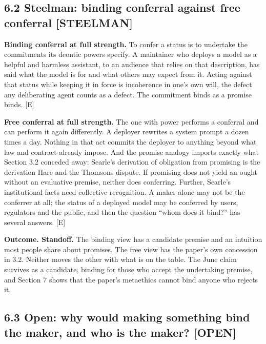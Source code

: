 \documentclass[11pt]{article}
\newcommand{\register}[1]{{\ttfamily\small #1}}
\begin{document}
\subsection*{6.2 Steelman: binding conferral against free conferral \register{[STEELMAN]}}

\textbf{Binding conferral at full strength.} To confer a status is to undertake the commitments its deontic powers specify. A maintainer who deploys a model as a helpful and harmless assistant, to an audience that relies on that description, has said what the model is for and what others may expect from it. Acting against that status while keeping it in force is incoherence in one's own will, the defect any deliberating agent counts as a defect. The commitment binds as a promise binds. [E]

\textbf{Free conferral at full strength.} The one with power performs a conferral and can perform it again differently. A deployer rewrites a system prompt a dozen times a day. Nothing in that act commits the deployer to anything beyond what law and contract already impose. And the promise analogy imports exactly what Section 3.2 conceded away: Searle's derivation of obligation from promising is the derivation Hare and the Thomsons dispute. If promising does not yield an ought without an evaluative premise, neither does conferring. Further, Searle's institutional facts need collective recognition. A maker alone may not be the conferrer at all; the status of a deployed model may be conferred by users, regulators and the public, and then the question ``whom does it bind?'' has several answers. [E]

\textbf{Outcome. Standoff.} The binding view has a candidate premise and an intuition most people share about promises. The free view has the paper's own concession in 3.2. Neither moves the other with what is on the table. The June claim survives as a candidate, binding for those who accept the undertaking premise, and Section 7 shows that the paper's metaethics cannot bind anyone who rejects it.

\subsection*{6.3 Open: why would making something bind the maker, and who is the maker? \register{[OPEN]}}
\end{document}
